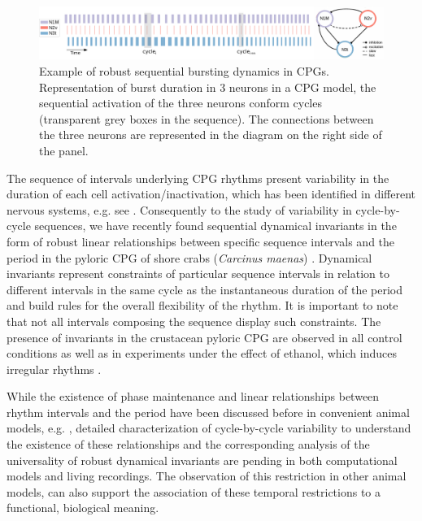 \begin{figure}[htb!]
	\includegraphics[width=\textwidth]{img/invariants/variability/sequences_in_cpgs.pdf}
	\caption{Example of robust sequential bursting dynamics in CPGs. Representation of burst duration in 3 neurons in a CPG model, the sequential activation of the three neurons conform cycles (transparent grey boxes in the sequence). The connections between the three neurons are represented in the diagram on the right side of the panel.}
	\label{fig:sequences_in_cpgs}
\end{figure}

The sequence of intervals underlying CPG rhythms present variability in the duration of each cell activation/inactivation, which has been identified in different nervous systems, e.g. see \cite{reyes_artificial_2008,Elliott1991,martinez_short-term_2019}. Consequently to the study of variability in cycle-by-cycle sequences, we have recently found sequential dynamical invariants in the form of robust linear relationships between specific sequence intervals and the period in the pyloric CPG of shore crabs (\textit{Carcinus maenas}) \cite{elices_robust_2019}. Dynamical invariants represent constraints of particular sequence intervals in relation to different intervals in the same cycle as the instantaneous duration of the period and build rules for the overall flexibility of the rhythm. It is important to note that not all intervals composing the sequence display such constraints. The presence of invariants in the crustacean pyloric CPG are observed in all control conditions as well as in experiments under the effect of ethanol, which induces irregular rhythms \cite{elices_robust_2019}. 



While the existence of phase maintenance and linear relationships between rhythm intervals and the period have been discussed before in convenient animal models, e.g. \cite{grillner_generation_1976,hooper_phase_1997,vavoulis_dynamic_2007}, detailed characterization of cycle-by-cycle variability to understand the existence of these relationships and the corresponding analysis of the universality of robust dynamical invariants are pending in both computational models and living recordings. The observation of this restriction in other animal models, can also support the association of these temporal restrictions to a functional, biological meaning.

